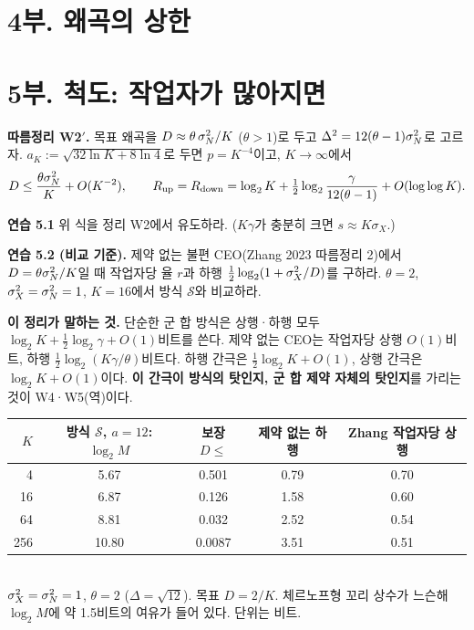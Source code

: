 \section*{4부. 왜곡의 상한}


\section*{5부. 척도: 작업자가 많아지면}

\textbf{따름정리 W2$'$.} 목표 왜곡을 $D\approx\theta\,\sigma_N^2/K$ ($\theta>1$)로 두고 $\Delta^2=12(\theta-1)\sigma_N^2$로 고르자. $a_K:=\sqrt{32\ln K+8\ln4}$로 두면 $p=K^{-4}$이고, $K\to\infty$에서
\[
D\le\frac{\theta\sigma_N^2}{K}+O(K^{-2}),\qquad
R_{\mathrm{up}}=R_{\mathrm{down}}=\log_2K+\tfrac12\log_2\frac{\gamma}{12(\theta-1)}+O(\log\log K).
\]

\textbf{연습 5.1} 위 식을 정리 W2에서 유도하라. ($Kγ$가 충분히 크면 $s\approx K\sigma_X$.) \vspace{3em}

\textbf{연습 5.2 (비교 기준).} 제약 없는 불편 CEO(Zhang 2023 따름정리 2)에서 $D=\theta\sigma_N^2/K$일 때 작업자당 율 $r$과 하행 $\frac12\log_2(1+\sigma_X^2/D)$를 구하라. $\theta=2$, $\sigma_X^2=\sigma_N^2=1$, $K=16$에서 방식 $\mathcal S$와 비교하라.
\vspace{4em}

\begin{bridge}
\textbf{이 정리가 말하는 것.} 단순한 군 합 방식은 상행·하행 모두 $\log_2K+\frac12\log_2\gamma+O(1)$비트를 쓴다. 제약 없는 CEO는 작업자당 상행 $O(1)$비트, 하행 $\frac12\log_2(K\gamma/\theta)$비트다. 하행 간극은 $\tfrac12\log_2K+O(1)$, 상행 간극은 $\log_2K+O(1)$이다. \textbf{이 간극이 방식의 탓인지, 군 합 제약 자체의 탓인지}를 가리는 것이 W4·W5(역)이다.
\end{bridge}

\begin{center}\small
\renewcommand{\arraystretch}{1.3}
\begin{tabular}{rcccc}
\toprule
$K$ & 방식 $\mathcal S$, $a=12$: $\log_2M$ & 보장 $D\le$ & 제약 없는 하행 & Zhang 작업자당 상행\\ \midrule
4 & 5.67 & 0.501 & 0.79 & 0.70\\
16 & 6.87 & 0.126 & 1.58 & 0.60\\
64 & 8.81 & 0.032 & 2.52 & 0.54\\
256 & 10.80 & 0.0087 & 3.51 & 0.51\\
\bottomrule
\end{tabular}\\[2pt]
$\sigma_X^2=\sigma_N^2=1$, $\theta=2$ ($\Delta=\sqrt{12}$). 목표 $D=2/K$. 체르노프형 꼬리 상수가 느슨해 $\log_2M$에 약 1.5비트의 여유가 들어 있다. 단위는 비트.
\end{center}

